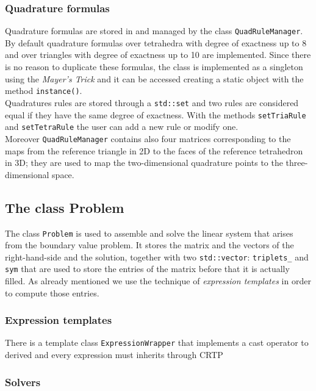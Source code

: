 \documentclass[12pt, a4paper]{article}
\theoremstyle{definition}
\theoremstyle{plain}
\theoremstyle{plain}
\theoremstyle{definition}
\begin{document}
\subsubsection{Quadrature formulas}

Quadrature formulas are stored in and managed by the class \lstinline|QuadRuleManager|. By default quadrature formulas over tetrahedra with degree of exactness up to 8 and over triangles with degree of exactness up to 10 are implemented. Since there is no reason to duplicate these formulas, the class is implemented as a singleton using the \emph{Mayer's Trick} and it can be accessed creating a static object with the method \lstinline|instance()|.\\
Quadratures rules are stored through a \lstinline|std::set| and two rules are considered equal if they have the same degree of exactness. With the methods \lstinline|setTriaRule| and \lstinline|setTetraRule| the user can add a new rule or modify one.\\
Moreover \lstinline|QuadRuleManager| contains also four matrices corresponding to the maps from the reference triangle in 2D to the faces of the reference tetrahedron in 3D; they are used to map the two-dimensional quadrature points to the three-dimensional space.\\
\subsection{The class Problem}

The class \lstinline|Problem| is used to assemble and solve the linear system that arises from the boundary value problem.
It stores the matrix and the vectors of the right-hand-side and the solution, together with two \lstinline|std::vector|: \lstinline|triplets_| and \lstinline|sym| that are used to store the entries of the matrix before that it is actually filled.
As already mentioned we use the technique of \emph{expression templates} in order to compute those entries.\\
\subsubsection{Expression templates}
There is a template class \lstinline|ExpressionWrapper| that implements a cast operator to derived and every expression must inherits through CRTP
\subsubsection{Solvers}
\end{document}
